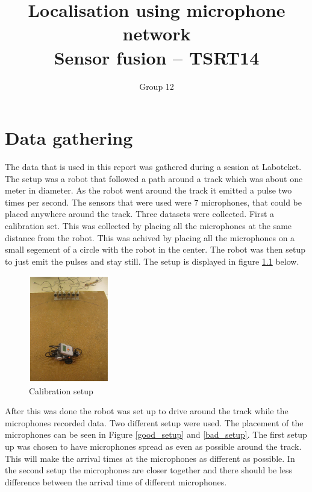 \documentclass[10pt,a4paper]{report}
\begin{document}
\title{Localisation using microphone network\\Sensor fusion -- TSRT14}
\author{Group 12}
\maketitle


\tableofcontents

\newpage
\chapter{Data gathering}
\label{Data gathering}
The data that is used in this report was gathered during a session at Laboteket.
The setup was a robot that followed a path around a track which was about one meter in diameter.
As the robot went around the track it emitted a pulse two times per second.
The sensors that were used were 7 microphones, that could be placed anywhere around the track.
Three datasets were collected.
First a calibration set. This was collected by placing all the microphones at the same distance from the robot.
This was achived by placing all the microphones on a small segement of a circle with the robot in the center.
The robot was then setup to just emit the pulses and stay still. The setup is displayed in figure \ref{calibtration_setup} below.
\begin{figure}[H]
\begin{center}
  \includegraphics[width = 100pt]{calibration_setup.png}
  \caption{Calibration setup}
  \label{calibtration_setup}
  \end{center}
\end{figure}

After this was done the robot was set up to drive around the track while the microphones recorded data.
Two different setup were used. The placement of the microphones can be seen in Figure \ref{good_setup} and \ref{bad_setup}.
The first setup up was chosen to have microphones spread as even as possible around the track.
This will make the arrival times at the microphones as different as possible.
In the second setup the microphones are closer together and there should be less difference between the arrival time of different microphones.
\end{document}

